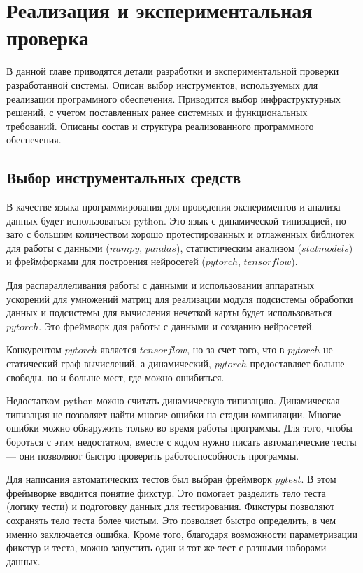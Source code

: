 \chapter{Реализация и экспериментальная проверка}

\begin{annotation}
	В данной главе приводятся детали разработки и экспериментальной проверки
	разработанной системы. Описан выбор инструментов, используемых для реализации
	программного обеспечения. Приводится выбор инфраструктурных решений,
	с учетом поставленных ранее системных и функциональных требований.
	Описаны состав и структура реализованного программного обеспечения.
\end{annotation}


\section{Выбор инструментальных средств}

В качестве языка программирования для проведения экспериментов и анализа данных
будет использоваться python. Это язык с динамической типизацией, но зато с
большим количеством хорошо протестированных и отлаженных библиотек для работы
с данными ($numpy$, $pandas$), статистическим анализом ($statmodels$) и фреймфорками для построения нейросетей ($pytorch$, $tensorflow$).

Для распараллеливания работы с данными и использовании аппаратных ускорений для умножений матриц
для реализации модуля подсистемы обработки данных и подсистемы для вычисления нечеткой карты
будет использоваться $pytorch$. Это фреймворк для работы с данными и созданию нейросетей.

Конкурентом $pytorch$ является $tensorflow$, но за счет того, что в $pytorch$ не статический
граф вычислений, а динамический, $pytorch$ предоставляет больше свободы, но и больше мест,
где можно ошибиться.

Недостатком python можно считать динамическую типизацию. Динамическая типизация не позволяет
найти многие ошибки на стадии компиляции. Многие ошибки можно обнаружить только во время
работы программы. Для того, чтобы бороться с этим недостатком, вместе с кодом нужно писать
автоматические тесты --- они позволяют быстро проверить работоспособность программы.

Для написания автоматических тестов был выбран фреймворк $ pytest $. В этом фреймворке
вводится понятие фикстур. Это помогает разделить тело теста (логику тести) и
подготовку данных для тестирования. Фикстуры позволяют сохранять тело
теста более чистым. Это позволяет быстро определить, в чем именно заключается ошибка.
Кроме того, благодаря возможности параметризации фикстур и теста, можно
запустить один и тот же тест с разными наборами данных.

